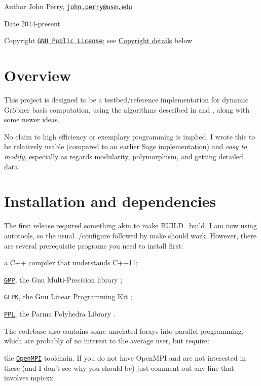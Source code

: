\begin{DoxyAuthor}{Author}
John Perry, \href{mailto:john.perry@usm.edu}{\tt john.\+perry@usm.\+edu} 
\end{DoxyAuthor}
\begin{DoxyDate}{Date}
2014-\/present 
\end{DoxyDate}
\begin{DoxyCopyright}{Copyright}
\href{../../COPYING.txt}{\tt G\+NU Public License}; see \hyperlink{index_Copyright}{Copyright details} below
\end{DoxyCopyright}
\hypertarget{index_Overview}{}\section{Overview}\label{index_Overview}
This project is designed to be a testbed/reference implementation for dynamic Gr\"{o}bner basis computation, using the algorithms described in \cite{CaboaraDynAlg} and \cite{CaboaraPerry}, along with some newer ideas.

No claim to high efficiency or exemplary programming is implied. I wrote this to be relatively usable (compared to an earlier Sage implementation) and {\itshape easy to modify}, especially as regards modularity, polymorphism, and getting detailed data.\hypertarget{index_Install}{}\section{Installation and dependencies}\label{index_Install}
The first release required something akin to {\ttfamily make B\+U\+I\+LD=build}. I am now using autotools, so the usual {\ttfamily ./configure} followed by {\ttfamily make} should work. However, there are several prerequisite programs you need to install first\+:
\begin{DoxyItemize}
\item a C++ compiler that understands C++11;
\item \href{https://gmplib.org/}{\tt G\+MP}, the Gnu Multi-\/\+Precision library \cite{gmp};
\item \href{https://www.gnu.org/software/glpk/}{\tt G\+L\+PK}, the Gnu Linear Programming Kit \cite{glpk};
\item \href{http://bugseng.com/products/ppl}{\tt P\+PL}, the Parma Polyhedra Library \cite{BagnaraHZ08SCP}.
\end{DoxyItemize}

The codebase also contains some unrelated forays into parallel programming, which are probably of no interest to the average user, but require\+:
\begin{DoxyItemize}
\item the \href{https://www.open-mpi.org/}{\tt Open\+M\+PI} toolchain. If you do not have Open\+M\+PI and are not interested in these (and I don't see why you should be) just comment out any line that involves {\ttfamily mpicxx}.
\end{DoxyItemize}

